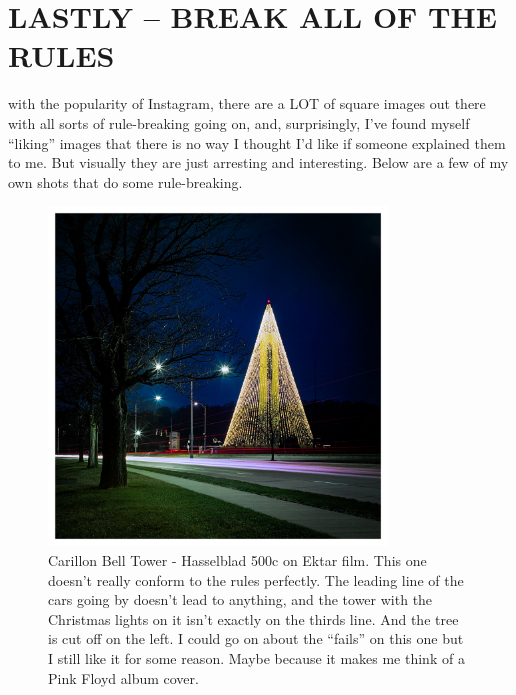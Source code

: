 \documentclass[a4paper]{article}
\begin{document}
\section*{LASTLY – BREAK ALL OF THE RULES} 
with the popularity of Instagram, there are a LOT of square images out there with all sorts of rule-breaking going on, and, surprisingly, I’ve found myself “liking” images that there is no way I thought I’d like if someone explained them to me. But visually they are just arresting and interesting. Below are a few of my own shots that do some rule-breaking.

\begin{figure}[ht!]
    \centering
    \includegraphics[width=90mm]{img/49224779302_9fe121cc9a_k.jpeg}
    \caption{Carillon Bell Tower - Hasselblad 500c on Ektar film. This one doesn’t really conform to the rules perfectly. The leading line of the cars going by doesn’t lead to anything, and the tower with the Christmas lights on it isn’t exactly on the thirds line. And the tree is cut off on the left. I could go on about the “fails” on this one but I still like it for some reason. Maybe because it makes me think of a Pink Floyd album cover.}
\end{figure}
\end{document}
